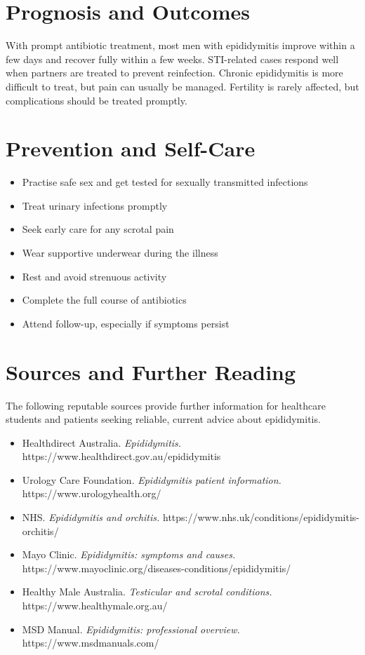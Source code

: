 \section*{Prognosis and Outcomes}
With prompt antibiotic treatment, most men with epididymitis improve within a few days and recover fully within a few weeks. STI-related cases respond well when partners are treated to prevent reinfection. Chronic epididymitis is more difficult to treat, but pain can usually be managed. Fertility is rarely affected, but complications should be treated promptly.

\section*{Prevention and Self-Care}
\begin{itemize}
    \item Practise safe sex and get tested for sexually transmitted infections
    \item Treat urinary infections promptly
    \item Seek early care for any scrotal pain
    \item Wear supportive underwear during the illness
    \item Rest and avoid strenuous activity
    \item Complete the full course of antibiotics
    \item Attend follow-up, especially if symptoms persist
\end{itemize}

\section*{Sources and Further Reading}
The following reputable sources provide further information for healthcare students and patients seeking reliable, current advice about epididymitis.
\begin{itemize}
    \item Healthdirect Australia. \textit{Epididymitis.} https://www.healthdirect.gov.au/epididymitis
    \item Urology Care Foundation. \textit{Epididymitis patient information.} https://www.urologyhealth.org/
    \item NHS. \textit{Epididymitis and orchitis.} https://www.nhs.uk/conditions/epididymitis-orchitis/
    \item Mayo Clinic. \textit{Epididymitis: symptoms and causes.} https://www.mayoclinic.org/diseases-conditions/epididymitis/
    \item Healthy Male Australia. \textit{Testicular and scrotal conditions.} https://www.healthymale.org.au/
    \item MSD Manual. \textit{Epididymitis: professional overview.} https://www.msdmanuals.com/
\end{itemize}
